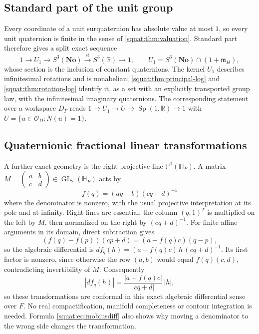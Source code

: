 \documentclass[11pt,letterpaper]{article}
\numberwithin{equation}{section}
\theoremstyle{definition}
\theoremstyle{remark}
\newcommand{\No}{\mathbf{No}}
\newcommand{\HF}{\mathbb H_F}
\newcommand{\R}{\mathbb R}
\newcommand{\OO}{\mathcal O}
\newcommand{\mm}{\mathfrak m}
\newcommand{\st}{\operatorname{st}}
\newcommand{\GL}{\operatorname{GL}}
\newcommand{\Sp}{\operatorname{Sp}}
\newcommand{\abs}[1]{\left|#1\right|}
\begin{document}
\subsection{Standard part of the unit group}\label{squat:sub:unitreduction}
Every coordinate of a unit surquaternion has absolute value at most $1$, so every unit
quaternion is finite in the sense of \cref{squat:thm:valuation}. Standard part therefore
gives a split exact sequence
\begin{equation}\label{squat:eq:unitsreduction}
 1\longrightarrow U_1\longrightarrow S^3(\No)\xrightarrow{\ \st\ }S^3(\R)
 \longrightarrow1,\qquad U_1=S^3(\No)\cap(1+\mm_H),
\end{equation}
whose section is the inclusion of constant quaternions. The kernel $U_1$ describes
infinitesimal rotations and is nonabelian; \cref{squat:thm:principal-log} and
\cref{squat:thm:rotation-log} identify it, as a set with an explicitly transported group law,
with the infinitesimal imaginary quaternions. The corresponding statement over a
workspace $D_\Gamma$ reads $1\to U_1\to U\to\Sp(1,\R)\to1$ with
$U=\{u\in\OO_D:N(u)=1\}$.

\subsection{Quaternionic fractional linear transformations}\label{squat:sub:mobius}
A further exact geometry is the right projective line $\mathbb P^1(\HF)$. A matrix
$M=\left(\begin{smallmatrix}a&b\\c&d\end{smallmatrix}\right)\in\GL_2(\HF)$ acts by
\begin{equation}\label{squat:eq:mobius}
 f(q)=(aq+b)(cq+d)^{-1}
\end{equation}
where the denominator is nonzero, with the usual projective interpretation at its pole
and at infinity. Right lines are essential: the column $(q,1)^T$ is multiplied on the
left by $M$, then normalized on the right by $(cq+d)^{-1}$. For finite affine arguments
in its domain, direct subtraction gives
\begin{equation}\label{squat:eq:mobiusdiff}
 (f(q)-f(p))(cp+d)=(a-f(q)c)(q-p),
\end{equation}
so the algebraic differential is $df_q(h)=(a-f(q)c)\,h\,(cq+d)^{-1}$. Its first factor is
nonzero, since otherwise the row $(a,b)$ would equal $f(q)(c,d)$, contradicting
invertibility of $M$. Consequently
\[
 \abs{df_q(h)}=\frac{\abs{a-f(q)c}}{\abs{cq+d}}\,\abs h,
\]
so these transformations are conformal in this exact algebraic differential sense over
$F$. No real compactification, manifold completeness or contour integration is needed.
Formula \cref{squat:eq:mobiusdiff} also shows why moving a denominator to the wrong side
changes the transformation.
\end{document}
